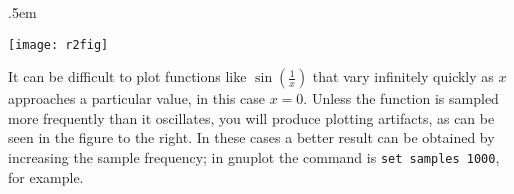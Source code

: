\documentclass[12pt]{article}
\begin{document}
\openup.5em
\begin{floatingfigure}{2.25in}
\texttt{[image: r2fig]}  
\end{floatingfigure}   
It can be difficult to plot functions like $\sin(\frac{1}{x})$ that vary infinitely quickly as $x$ approaches a particular value, in this case $x=0$. 
Unless the function is sampled more frequently than it oscillates, you will produce plotting artifacts, as can be seen in the figure to the right.
In these cases a better result can be obtained by increasing the sample frequency; in gnuplot the command is {\tt set samples 1000}, for example.
\end{document}
